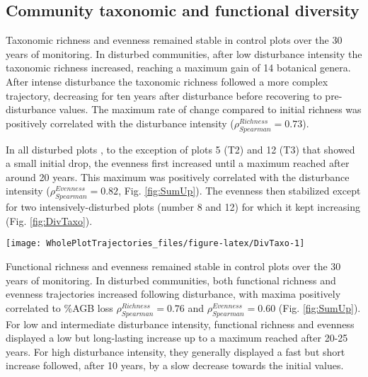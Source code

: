 \documentclass[fleqn,10pt]{ArtEcoFoG} %
\begin{document}
\subsection{Community taxonomic and functional
diversity}\label{community-taxonomic-and-functional-diversity}

Taxonomic richness and evenness remained stable in control plots over
the 30 years of monitoring. In disturbed communities, after low
disturbance intensity the taxonomic richness increased, reaching a
maximum gain of 14 botanical genera. After intense disturbance the
taxonomic richness followed a more complex trajectory, decreasing for
ten years after disturbance before recovering to pre-disturbance values.
\color{red}The maximum rate of change compared to initial richness was
positively correlated with the disturbance intensity
(\(\rho_{Spearman}^{Richness}=0.73\)).\color{black}

In all disturbed plots \color{red}, to the exception of plots 5 (T2) and
12 (T3) that showed a small initial drop, \color{black} the evenness
first increased until a maximum reached after around 20 years. This
maximum was positively correlated with the disturbance intensity
(\(\rho_{Spearman}^{Evenness}=0.82\), \color{red} Fig.
\ref{fig:SumUp})\color{black}. The evenness then stabilized except for
two intensively-disturbed plots (number 8 and 12) for which it kept
increasing (Fig. \ref{fig:DivTaxo}).

\begin{figure*}

{\centering \texttt{[image: WholePlotTrajectories\_files/figure-latex/DivTaxo-1]} 

}

\caption{Trajectories of community taxonomic richness \textbf{(a)}, taxonomic evenness, \textbf{(b)}, functional richness \textbf{(c)}, and functional evenness \textbf{(d)}. Values correspond to the difference over 30 years of community diversity with the values of 1989 inventories of reference, 5 years after disturbance. Shaded areas are the credibility intervals }\label{fig:DivTaxo}
\end{figure*}

Functional richness and evenness remained stable in control plots over
the 30 years of monitoring. \color{red}In disturbed communities, both
functional richness and evenness trajectories increased following
disturbance, with maxima positively correlated to \%AGB loss
\(\rho_{Spearman}^{Richness} = 0.76\) and
\(\rho_{Spearman}^{Evenness} = 0.60\) (Fig. \ref{fig:SumUp}).
\color{black} For low \color{red}and intermediate
\color{black}disturbance intensity, functional richness and evenness
displayed a low but long-lasting increase up to a maximum reached after
20-25 years. For high disturbance intensity, they generally displayed a
fast but short increase followed, after 10 years, by a slow decrease
towards the initial values.
\end{document}
